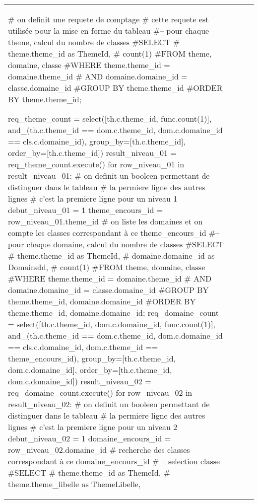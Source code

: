 \documentclass[12pt,titlepage,oneside]{book}
\begin{document}
\begin{supertabular}{|p{7.5cm}|p{7.5cm}|c|p{10cm}|}

\begin{lbdpython}

# on definit une requete de comptage
# cette requete est utilisée pour la mise en forme du tableau
#-- pour chaque theme, calcul du nombre de classes
#SELECT
#   theme.theme_id as ThemeId,
#   count(1)
#FROM theme, domaine, classe
#WHERE theme.theme_id = domaine.theme_id 
#  AND domaine.domaine_id = classe.domaine_id
#GROUP BY theme.theme_id
#ORDER BY theme.theme_id;

req_theme_count = select([th.c.theme_id, func.count(1)],
                  and_(th.c.theme_id == dom.c.theme_id,
                       dom.c.domaine_id == cls.c.domaine_id),
                  group_by=[th.c.theme_id],
                  order_by=[th.c.theme_id])
result_niveau_01 = req_theme_count.execute()
for row_niveau_01 in result_niveau_01:
   # on definit un booleen permettant de distinguer dans le tableau
   # la permiere ligne des autres lignes
   # c'est la premiere ligne pour un niveau 1
   debut_niveau_01 = 1
   theme_encours_id = row_niveau_01.theme_id
   # on liste les domaines et on compte les classes correspondant à ce theme_encours_id
   #-- pour chaque domaine, calcul du nombre de classes
   #SELECT
   #   theme.theme_id as ThemeId,
   #   domaine.domaine_id as DomaineId,
   #   count(1)
   #FROM theme, domaine, classe
   #WHERE theme.theme_id = domaine.theme_id 
   #  AND domaine.domaine_id = classe.domaine_id
   #GROUP BY theme.theme_id, domaine.domaine_id
   #ORDER BY theme.theme_id, domaine.domaine_id;
   req_domaine_count = select([th.c.theme_id, dom.c.domaine_id, func.count(1)],
                       and_(th.c.theme_id == dom.c.theme_id,
                            dom.c.domaine_id == cls.c.domaine_id,
                            dom.c.theme_id == theme_encours_id),
                       group_by=[th.c.theme_id, dom.c.domaine_id],
                       order_by=[th.c.theme_id, dom.c.domaine_id])
   result_niveau_02 = req_domaine_count.execute()
   for row_niveau_02 in result_niveau_02:
      # on definit un booleen permettant de distinguer dans le tableau
      # la permiere ligne des autres lignes
      # c'est la premiere ligne pour un niveau 2
      debut_niveau_02 = 1
      domaine_encours_id = row_niveau_02.domaine_id
      # recherche des classes correspondant à ce domaine_encours_id
      # -- selection classe
      #SELECT
      #   theme.theme_id as ThemeId,
      #   theme.theme_libelle as ThemeLibelle,

\end{lbdpython}
\end{supertabular}
\end{document}
